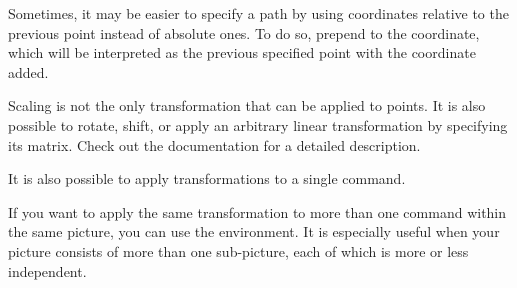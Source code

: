 Sometimes, it may be easier to specify a path by using coordinates relative to
the previous point instead of absolute ones. To do so, prepend \ltx{++} to the
coordinate, which will be interpreted as the previous specified point with the
coordinate added. %
\begin{example}
\end{example}

Scaling is not the only transformation that can be applied to points. It is
also possible to rotate, shift, or apply an arbitrary linear transformation by
specifying its matrix. Check out the documentation for a detailed description.
\begin{example}
\end{example}
It is also possible to apply transformations to a single command.
\begin{example}
\end{example}
If you want to apply the same transformation to more than one command within
the same picture, you can use the  environment. It is especially useful
when your picture consists of more than one sub-picture, each of which is more
or less independent.
\begin{example}[vertical_mode, examplewidth=0.7\linewidth]
\end{example}

